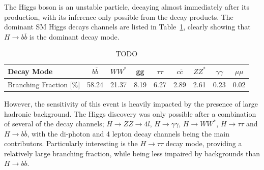 The Higgs boson is an unstable particle, decaying almost immediately after its production, with its inference only possible from the decay products. The dominant SM Higgs decays channels are listed in Table~\ref{Table:Introduction_HiggsBranchingFractions}, clearly showing that $H\rightarrow b\overline{b}$ is the dominant decay mode. 

\begin{table}[h]
\begin{tabular}{l|c|c|c|c|c|c|c|c}
\hline
Decay Mode                  & $b\overline{b}$    & $WW^*$    & gg   & $\tau\tau$   & $c\overline{c}$   & $ZZ^*$      & $\gamma\gamma$ & $\mu\mu$ \\ \hline
Branching Fraction {[}\%{]} & 58.24 & 21.37 & 8.19 & 6.27 & 2.89 & 2.61 & 0.23                            & 0.02
\end{tabular}
\caption{TODO}
\label{Table:Introduction_HiggsBranchingFractions}
\end{table}

However, the sensitivity of this event is heavily impacted by the presence of large hadronic background. The Higgs discovery was only possible after a combination of several of the decay channels; $H\rightarrow ZZ \rightarrow 4l$, $H\rightarrow \gamma \gamma$, $H\rightarrow WW^*$, $H\rightarrow \tau\tau$ and $H\rightarrow b\overline{b}$, with the di-photon and 4 lepton decay channels being the main contributors. Particularly interesting is the $H\rightarrow \tau\tau$ decay mode, providing a relatively large branching fraction, while being less impaired by backgrounds than $H\rightarrow b\overline{b}$.

\cite{Rowling_1997}
